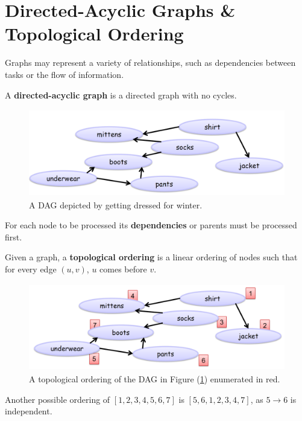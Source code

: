 \section{Directed-Acyclic Graphs \& Topological Ordering}
Graphs may represent a variety of relationships, such as dependencies between tasks or the flow of information. 

\begin{Def}
    
    A \textbf{directed-acyclic graph} is a directed graph with no cycles.
\end{Def}

\begin{figure}[h]
    \begin{center}
      \includegraphics[height=1.5in]{./Sections/graphs/dag/dag.png}
    \end{center}
     \caption{A DAG depicted by getting dressed for winter.}\label{fig:dag}
\end{figure}

\noindent
For each node to be processed its \textbf{dependencies} or parents must be processed first.

\newpage
\begin{Def}

    Given a graph, a \textbf{topological ordering} is a linear ordering of nodes such that for every edge $(u,v)$, $u$ comes before $v$.
\end{Def}

\begin{figure}[h]
    \begin{center}
      \includegraphics[height=1.5in]{./Sections/graphs/dag/top.png}
    \end{center}
     \caption{A topological ordering of the DAG in Figure (\ref{fig:dag}) enumerated in red.}\label{fig:top}
\end{figure}
\noindent
Another possible ordering of $[1,2,3,4,5,6,7]$ is $[5, 6,1,2,3,4,7]$, as $5\rightarrow 6$ is independent.

